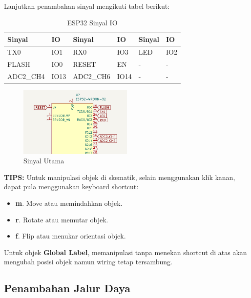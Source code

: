 \documentclass[12pt]{book}
\begin{document}
	\newpage
	Lanjutkan penambahan sinyal mengikuti tabel berikut:

	\begin{table}[h!]
		\begin{center}
			\begin{tabular}{|l|l|l|l|l|l|}
				\toprule
				Sinyal & IO & Sinyal & IO & Sinyal & IO \\
				\midrule
				TX0 & IO1 & RX0 & IO3 & LED & IO2 \\
				FLASH & IO0 & RESET & EN & - & - \\
				ADC2\_CH4 & IO13 & ADC2\_CH6 & IO14 & - & - \\
				\bottomrule
			\end{tabular}
			\caption{ESP32 Sinyal IO}
		\end{center}
	\end{table}

	\begin{figure}[!ht]
		\centering
		\includegraphics[width=0.5\textwidth]{images/sch/sch_7}
		\caption{Sinyal Utama}
	\end{figure}

	\textbf{TIPS:} Untuk manipulasi objek di skematik, selain menggunakan klik kanan, dapat pula menggunakan
	keyboard shortcut:
	\begin{itemize}
		\item \textbf{m}. Move atau memindahkan objek.

		\item \textbf{r}. Rotate atau memutar objek.

		\item \textbf{f}. Flip atau menukar orientasi objek.
	\end{itemize}

	Untuk objek \textbf{Global Label}, memanipulasi tanpa menekan shortcut di atas akan mengubah posisi objek namun wiring tetap tersambung.

	\subsection{Penambahan Jalur Daya}
\end{document}
